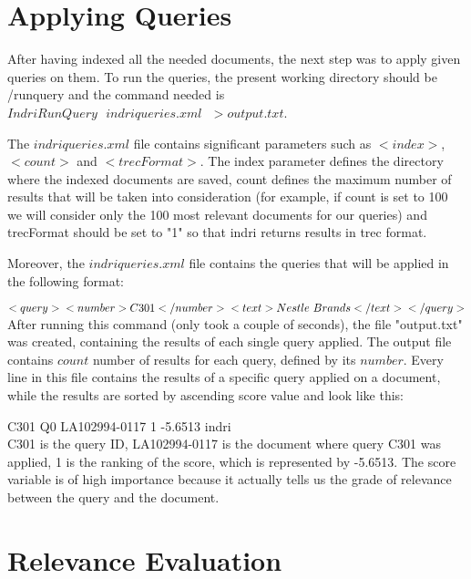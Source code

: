 \documentclass[letterpaper,11pt]{article}
\begin{document}
\newpage

\section{Applying Queries}

After having indexed all the needed documents, the next step was to apply given queries on them. To run the queries, the present working directory should be /runquery and the command needed is $IndriRunQuery \text{ }indriqueries.xml \text{ } >output.txt$. 

The $indriqueries.xml$ file contains significant parameters such as $<index>$, $<count>$ and $<trecFormat>$. The index parameter defines the directory where the indexed documents are saved, count defines the maximum number of results that will be taken into consideration (for example, if count is set to 100 we will consider only the 100 most relevant documents for our queries) and trecFormat should be set to "1" so that indri returns results in trec format.

Moreover, the $indriqueries.xml$ file contains the queries that will be applied in the following format: 

$<query>\\
<number>C301</number>\\
<text>Nestle \text{ }Brands</text>\\
</query>$\\

After running this command (only took a couple of seconds), the file "output.txt" was created, containing the results of each single query applied. The output file contains $count$ number of results for each query, defined by its $number$. Every line in this file contains the results of a specific query applied on a document, while the results are sorted by ascending score value and look like this: 

C301 Q0 LA102994-0117 1 -5.6513 indri\\

C301 is the query ID, LA102994-0117 is the document where query C301 was applied, 1 is the ranking of the score, which is represented by -5.6513. The score variable is of high importance because it actually tells us the grade of relevance between the query and the document.



\section{Relevance Evaluation}
\end{document}
